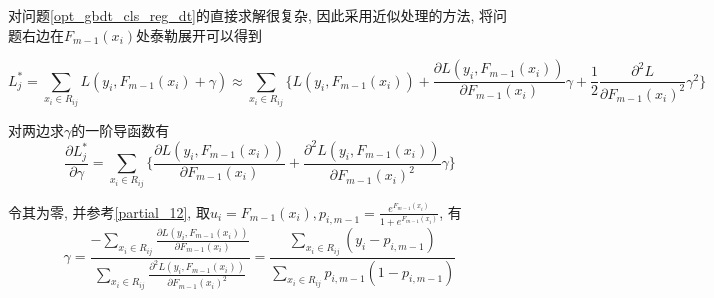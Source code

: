 \begin{remark}
    对问题\ref{opt_gbdt_cls_reg_dt}的直接求解很复杂, 因此采用近似处理的方法, 将问题右边在$F_{m-1}(x_i)$处泰勒展开可以得到

    \begin{equation*}
        L_j^* =\sum_{x_i\in R_{ij}}L(y_i, F_{m-1}(x_i) + \gamma) \approx \sum_{x_i\in R_{ij}}\Big\{L(y_i, F_{m-1}(x_i)) + \frac{\partial L(y_i, F_{m-1}(x_i))}{\partial F_{m-1}(x_i)}\gamma + \frac{1}{2}\frac{\partial^2 L}{\partial F_{m-1}(x_i)^2}\gamma^2\Big\}
    \end{equation*}

    对两边求$\gamma$的一阶导函数有
    \begin{equation*}
        \frac{\partial L_j^*}{\partial \gamma} = \sum_{x_i\in R_{ij}} \Big\{\frac{\partial L(y_i, F_{m-1}(x_i))}{\partial F_{m-1}(x_i)} + \frac{\partial^2 L(y_i, F_{m-1}(x_i))}{\partial F_{m-1}(x_i)^2}\gamma\Big\}
    \end{equation*}

    令其为零, 并参考\ref{partial_12}, 取$u_i=F_{m-1}(x_i), p_{i, m-1} = \frac{e^{F_{m-1}(x_i)}}{1 + e^{F_{m-1}(x_i)} }$, 有
    \begin{equation}
        \gamma = \frac{-\sum_{x_i\in R_{ij}}\frac{\partial L(y_i, F_{m-1}(x_i))}{\partial F_{m-1}(x_i)}}{\sum_{x_i\in R_{ij}}\frac{\partial^2 L(y_i, F_{m-1}(x_i))}{\partial F_{m-1}(x_i)^2}} = \frac{\sum_{x_i\in R_{ij}}(y_i-p_{i, m-1})}{\sum_{x_i\in R_{ij}}p_{i, m-1}(1-p_{i, m-1})}
    \end{equation}

\end{remark}

